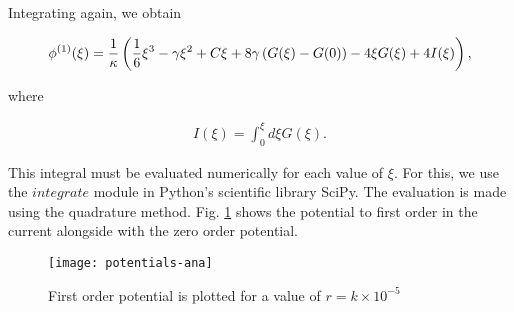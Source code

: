 Integrating again, we obtain

\begin{align}
\phi^{(1)}(\xi) = \frac{1}{\kappa}\left({\frac{1}{6}\xi^3 -\gamma \xi^2 + C\xi + 8 \gamma \left({G(\xi)-G(0)}\right) - 4 \xi G(\xi) + 4 I(\xi)}\right),
\end{align}

where

\begin{align}
	I(\xi) = \int_0^{\xi} d\xi G(\xi).
\end{align}

This integral must be evaluated numerically for each value of $\xi$. For this, we use the $integrate$ module in Python's scientific library SciPy. The evaluation is made using the quadrature method. Fig. \ref{fig:firstorderphi} shows the potential to first order in the current alongside with the zero order potential. 

\begin{figure}[h!]
 \centering
 \texttt{[image: potentials-ana]}
 \caption{First order potential is plotted for a value of $r = k \times 10^{-5}$}
 \label{fig:firstorderphi}
\end{figure}